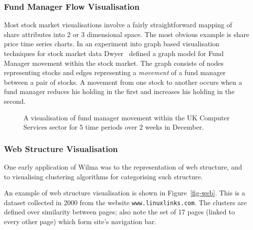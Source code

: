 \documentclass[runningheads]{cl2emult}
\newcommand{\url}[1]{{\small{\tt #1}}}
\begin{document}
\subsubsection{Fund Manager Flow Visualisation} \label{sec:fmflow}
Most stock market visualisations involve a fairly straightforward
mapping of share attributes into 2 or 3 dimensional space.  The most
obvious example is share price time series charts.  In an experiment
into graph based visualisation techniques for stock market data
Dwyer~\cite{dwyer02fmflow} defined a graph model for Fund Manager
movement within the stock market.  The graph consists of nodes
representing stocks and edges representing a {\em movement} of a
fund manager between a pair of stocks.  A movement from one stock to
another occurs when a fund manager reduces his holding in the first
and increases his holding in the second.

\begin{figure}[h]
  \centering
  \caption{A visualisation of fund manager movement within the UK
  Computer Services sector for 5 time periods over 2 weeks in December.}
\end{figure}

\subsubsection{Web Structure Visualisation}

One early application of Wilma was to the representation of web structure, and
to visualising clustering algorithms for categorising such
structure\cite{eckersley2kclassiscope}.

An example of web structure visualisation is shown in Figure~\ref{fig-web}.
This is a dataset collected in 2000 from the website \url{www.linuxlinks.com}.
The clusters are defined over similarity between pages; also note the set of
17 pages (linked to every other page) which form site's navigation bar.
\end{document}
